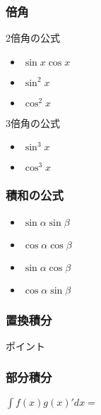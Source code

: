 \documentclass[10pt,dvipdfmx]{jsarticle}
\begin{document}
\subsubsection*{倍角}
\begin{multicols}{2}
  2倍角の公式
  \begin{Large}
    \begin{itemize}
      \item $\sin x\cos x$
      \item $\sin^2 x$
      \item $\cos^2 x$
    \end{itemize}
  \end{Large}

  3倍角の公式
  \begin{Large}
    \begin{itemize}
      \item $\sin^3 x$
      \item $\cos^3 x$
    \end{itemize}
  \end{Large}
\end{multicols}

\subsubsection*{積和の公式}
\begin{multicols}{2}
  \begin{Large}
    \begin{itemize}
      \item $\sin \alpha\sin \beta$
      \item $\cos \alpha\cos \beta$
      \item $\sin \alpha\cos \beta$
      \item $\cos \alpha\sin \beta$
    \end{itemize}
  \end{Large}
\end{multicols}

\subsubsection*{置換積分}
\begin{itembox}[l]{ポイント}
  \vspace{15mm}
\end{itembox}

\subsubsection*{部分積分}
\begin{Large}
  $\int f(x)g(x)' dx=$
\end{Large}
\end{document}
